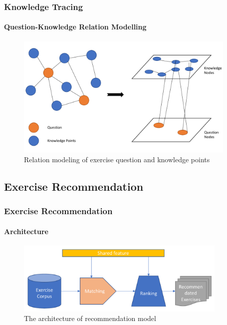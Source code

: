 \documentclass[10pt,aspectratio=43,mathserif]{beamer}
\begin{document}
\begin{frame}
	\frametitle{Knowledge Tracing}
	\framesubtitle{Question-Knowledge Relation Modelling}
	\begin{figure}
		\centering
		\includegraphics[width=0.94\textwidth]{figures/ch3-gat-kq.pdf}
		\caption{Relation modeling of exercise question and knowledge points}
	\end{figure}
\end{frame}







\subsection{Exercise Recommendation}
\begin{frame}
	\frametitle{Exercise Recommendation}
	\framesubtitle{Architecture}
	\begin{figure}
		\includegraphics[width=0.9\textwidth]{figures/ch4-ov.pdf}
		\caption{The architecture of recommendation model}
	\end{figure}
\end{frame}
\end{document}
